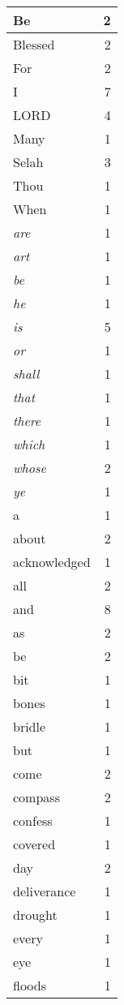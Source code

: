 \begin{center}
\begin{longtable}{l|r}
\hline \hline
\endlastfoot
Be & 2 \\ \hline
Blessed & 2 \\ \hline
For & 2 \\ \hline
I & 7 \\ \hline
LORD & 4 \\ \hline
Many & 1 \\ \hline
Selah & 3 \\ \hline
Thou & 1 \\ \hline
When & 1 \\ \hline
\emph{are} & 1 \\ \hline
\emph{art} & 1 \\ \hline
\emph{be} & 1 \\ \hline
\emph{he} & 1 \\ \hline
\emph{is} & 5 \\ \hline
\emph{or} & 1 \\ \hline
\emph{shall} & 1 \\ \hline
\emph{that} & 1 \\ \hline
\emph{there} & 1 \\ \hline
\emph{which} & 1 \\ \hline
\emph{whose} & 2 \\ \hline
\emph{ye} & 1 \\ \hline
a & 1 \\ \hline
about & 2 \\ \hline
acknowledged & 1 \\ \hline
all & 2 \\ \hline
and & 8 \\ \hline
as & 2 \\ \hline
be & 2 \\ \hline
bit & 1 \\ \hline
bones & 1 \\ \hline
bridle & 1 \\ \hline
but & 1 \\ \hline
come & 2 \\ \hline
compass & 2 \\ \hline
confess & 1 \\ \hline
covered & 1 \\ \hline
day & 2 \\ \hline
deliverance & 1 \\ \hline
drought & 1 \\ \hline
every & 1 \\ \hline
eye & 1 \\ \hline
floods & 1 \\ \hline

\end{longtable}
\end{center}
